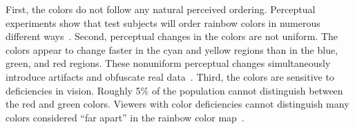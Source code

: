 \documentclass{llncs}
\newcommand{\lcite}[1]{~\cite{#1}}
\begin{document}
{}{

  First, the colors do not follow any natural
  perceived ordering.  Perceptual experiments show that test subjects will
  order rainbow colors in numerous different ways\lcite{Ware04}.  Second,
  perceptual changes in the colors are not uniform.  The colors appear to
  change faster in the cyan and yellow regions than in the blue, green, and
  red regions.  These nonuniform perceptual changes simultaneously
  introduce artifacts and obfuscate real data\lcite{Borland07}.  Third, the
  colors are sensitive to deficiencies in vision.  Roughly 5\% of the
  population cannot distinguish between the red and green colors.  Viewers
  with color deficiencies cannot distinguish many colors considered ``far
  apart'' in the rainbow color map\lcite{Light04}.

}
\end{document}
